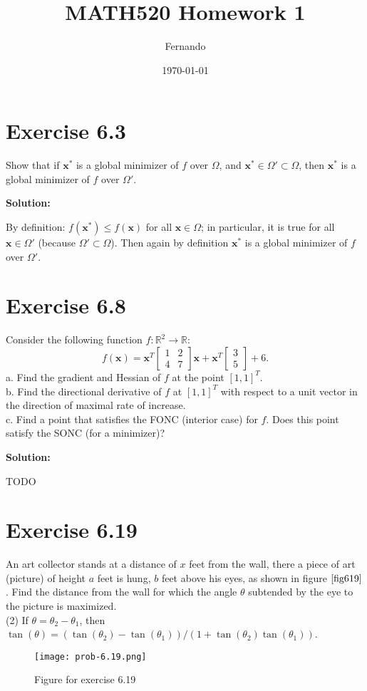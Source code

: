 \documentclass{article}
\newcommand{\bld}[1]{\boldsymbol{#1}}
\begin{document}
\title{MATH520 Homework 1}
\author{Fernando}
\date{\today}
\maketitle

\section*{Exercise 6.3}
Show that if $\bld{x}^*$ is a global minimizer of $f$ over $\Omega$, and
$\bld{x}^*\in\Omega'\subset \Omega$, then $\bld{x}^*$ is a global minimizer of $f$ over
$\Omega'$.

\textbf{Solution:}

By definition: $f(\bld{x}^*)\leq f(\bld{x})$ for all $\bld{x}\in \Omega$; in
particular, it is true for all $\bld{x}\in\Omega'$ (because $\Omega'\subset
\Omega$). Then again by definition $\bld{x}^*$ is a global minimizer of $f$
over $\Omega'$.
\section*{Exercise 6.8}
Consider the following function $f:\mathbb{R}^2 \to \mathbb{R}$:
\[
	f(\bld{x})=\bld{x}^T
	\begin{bmatrix}
	1 & 2\\
	4 & 7
	\end{bmatrix}
	\bld{x} + \bld{x}^T
	\begin{bmatrix}
	3\\
	5
	\end{bmatrix}
	+ 6.
\]
a. Find the gradient and Hessian of $f$ at the point $[1,1]^T$.\\
b. Find the directional derivative of $f$ at $[1,1]^T$ with respect to a unit
vector in the direction of maximal rate of increase.\\
c. Find a point that satisfies the FONC (interior case) for $f$. Does this
point satisfy the SONC (for a minimizer)?

\textbf{Solution:}

TODO
\section*{Exercise 6.19}
An art collector stands at a distance of $x$ feet from the wall, there a piece
of art (picture) of height $a$ feet is hung, $b$ feet above his eyes, as shown
in figure $\ref{fig619}$. Find the distance from the wall for which the angle $\theta$
subtended by the eye to the picture is maximized.\\
(2) If $\theta = \theta_2 - \theta_1$, then
$\tan(\theta)=(\tan(\theta_2)-\tan(\theta_1))/(1+\tan(\theta_2)\tan(\theta_1))$.
\begin{figure}[ht]
	\center
	\caption{Figure for exercise 6.19}
	\texttt{[image: prob-6.19.png]}
	\label{fig619}
\end{figure}
\end{document}
